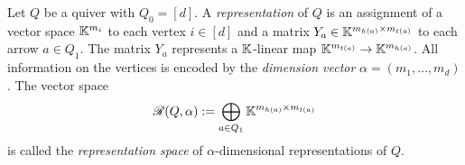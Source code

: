\begin{defn}\label{defn:QuiverRepresentation}
	Let $Q$ be a quiver with $Q_0 = [d]$. A \emph{representation} of $Q$ is an assignment of a vector space $\mathbb K^{m_i}$ to each vertex $i \in [d]$ and a matrix $Y_a \in \mathbb K^{m_{h(a)} \times m_{t(a)}}$ to each arrow $a \in Q_1$. The matrix $Y_a$ represents a $\mathbb K$-linear map $\mathbb K^{m_{t(a)}} \to \mathbb K^{m_{h(a)}}$. All information on the vertices is encoded by the \emph{dimension vector} $\alpha = (m_1,\ldots,m_d)$. The vector space
		\[ \mathscr{R}(Q, \alpha) := \bigoplus_{a \in Q_1} \mathbb K^{m_{h(a)} \times m_{t(a)}} \]
	is called the \emph{representation space} of $\alpha$-dimensional representations of $Q$.
	\hfill{}
\end{defn}


